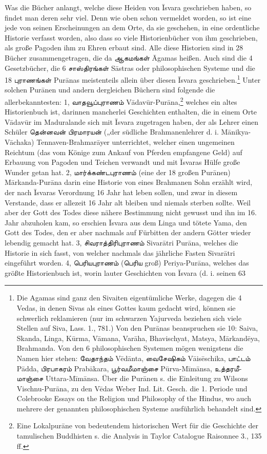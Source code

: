 \documentclass{article}
\newcommand{\TamilText}[1]{\texttamil{#1}}
\newcommand{\tam}[1]{\TamilText{#1}}
\begin{document}
Was die Bücher anlangt, welche diese Heiden von \={I}svara geschrieben haben, so findet man deren sehr viel. Denn wie oben schon vermeldet worden, so ist eine jede von seinen Erscheinungen an dem Orte, da sie geschehen, in eine ordentliche Historie verfasst worden, also dass so viele Historienbücher von ihm geschrieben, als große Pagoden ihm zu Ehren erbaut sind. Alle diese Historien sind in 28 Bücher zusammengetragen, die da \tam{ஆகமங்கள்} \={A}gamas heißen. Auch sind die 4 Gesetzbücher, die 6 \tam{சாஸ்திரங்கள்} S\={a}stras oder philosophischen Systeme und die 18 \tam{புராணங்கள்} Pur\={a}nas meistenteils allein über diesen \={I}svara geschrieben.\footnote{Die Agamas sind ganz den Sivaiten eigentümliche Werke, dagegen die 4 Vedas, in denen Sivas als eines Gottes kaum gedacht wird, können sie schwerlich reklamieren (nur im schwarzen Yajurveda beziehen sich viele Stellen auf Siva, Lass. 1., 781.) Von den Pur\={a}nas beanspruchen sie 10: Saiva, Skanda, Linga, K\={u}rma, V\={a}mana, Var\={a}ha, Bhavischyat, Matsya, M\={a}rkand\={e}ya, Brahmanda. Von den 6 philosophischen Systemen mögen wenigstens die Namen hier stehen: \tam{வேதாந்தம்} V\={e}d\={a}nta, \tam{வைசேஷிகம்} V\={a}is\={e}schika, \tam{பாட்டம்} P\={a}dda, \tam{பிரபாகரம்} Prab\={a}kara, \tam{பூர்வமீமாஞ்சை} P\={u}rva-M\={i}m\={a}nsa, \tam{உத்தரமீமாஞ்சை} Uttara-M\={i}m\={a}nsa. Über die Pur\={a}nen s. die Einleitung zu Wilsons Vischnu-Pur\={a}na, zu den V\={e}das Weber Ind. Lit. Gesch. die 1. Periode und Colebrooke Essays on the Religion und Philosophy of the Hindus, wo auch mehrere der genannten philosophischen Systeme ausführlich behandelt sind.} Unter solchen Pur\={a}nen und andern dergleichen Büchern sind folgende die allerbekanntesten: 1, \tam{வாதவூப்புராணம்} V\={a}dav\={u}r-Pur\={a}na,\footnote{Eine Lokalpur\={a}ne von bedeutendem historischen Wert für die Geschichte der tamulischen Buddhisten s. die Analysis in Taylor Catalogue Raisonnee 3., 135 ff.} welches ein altes Historienbuch ist, darinnen mancherlei Geschichten enthalten, die in einem Orte V\={a}dav\={u}r im Maduralande sich mit \={I}svara zugetragen haben, der als Lehrer einen Schüler \tam{தென்னவன்} \tam{பிரமாரயன்} („der südliche Brahmanenlehrer d. i. M\={a}nikya-V\={a}chaka) Tennaven-Brahmar\={a}yer unterrichtet, welcher einen ungemeinen Reichtum (das vom Könige zum Ankauf von Pferden empfangene Geld) auf Erbauung von Pagoden und Teichen verwandt und mit \={I}svaras Hülfe große Wunder getan hat. 2, \tam{மார்க்கண்டபுராணம்} (eine der 18 großen Pur\={a}nen) M\={a}rkanda-Pur\={a}na darin eine Historie von eines Brahmanen Sohn erzählt wird, der nach \={I}svaras Verordnung 16 Jahr hat leben sollen, und zwar in diesem Verstande, dass er allezeit 16 Jahr alt bleiben und niemals sterben sollte. Weil aber der Gott des Todes diese nähere Bestimmung nicht gewusst und ihn im 16. Jahr abzuholen kam, so erschien \={I}svara aus dem Linga und tötete Yama, den Gott des Todes, den er aber nachmals auf Fürbitten der andern Götter wieder lebendig gemacht hat. 3, \tam{சிவராத்திரிபுராணம்} Sivar\={a}tri Pur\={a}na, welches die Historie in sich fasst, von welcher nachmals das jährliche Fasten Sivar\={a}tri eingeführt worden. 4, \tam{பெரியபுராணம்} (\tam{பெரிய} groß) Periya-Pur\={a}na, welches das größte Historienbuch ist, worin lauter Geschichten von \={I}svara (d. i. seinen 63 
\end{document}
